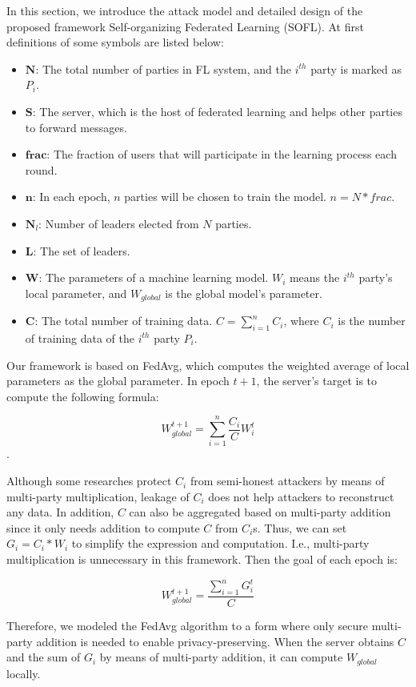 In this section, we introduce the attack model and detailed design of the proposed framework Self-organizing Federated Learning (SOFL). At first definitions of some symbols are listed below:
\begin{itemize}
    \item $\textbf{N}$: The total number of parties in FL system, and the  $i^{th}$ party is marked as $P_i$.
    \item $\textbf{S}$: The server, which is the host of federated learning and helps other parties to forward messages.
    \item $\textbf{frac}$: The fraction of users that will participate in the learning process each round.
    \item $\textbf{n}$: In each epoch, $n$ parties will be chosen to train the model. $n = N * frac$.
    \item $\textbf{N}_l$: Number of leaders elected from $N$ parties.
    \item $\textbf{L}$: The set of leaders.
    \item $\textbf{W}$: The parameters of a machine learning model. $W_i$ means the $i^{th}$ party's local parameter, and $W_{global}$ is the global model's parameter.
    \item $\textbf{C}$: The total number of training data. $C = \sum_{i=1}^nC_i$, where $C_i$ is the number of training data of the $i^{th}$ party $P_i$.
\end{itemize}

Our framework is based on FedAvg, which computes the weighted average of local parameters as the global parameter. In epoch $t+1$, the server's target is to compute the following formula:

$$W_{global}^{t+1} = \sum_{i=1}^n\frac{C_i}{C}W_i^t$$. 

Although some researches protect $C_i$ from semi-honest attackers by means of multi-party multiplication, leakage of $C_i$ does not help attackers to reconstruct any data. In addition, $C$ can also be aggregated based on multi-party addition since it only needs addition to compute $C$ from $C_i$s. Thus, we can set $G_i = C_i * W_i$ to simplify the expression and computation. I.e., multi-party multiplication is unnecessary in this framework. Then the goal of each epoch is:

$$ W_{global}^{t+1} = \frac{\sum_{i=1}^nG_i^t}{C} $$

Therefore, we modeled the FedAvg algorithm to a form where only secure multi-party addition is needed to enable privacy-preserving. When the server obtains $C$ and the sum of $G_i$ by means of multi-party addition, it can compute $W_{global}$ locally.

